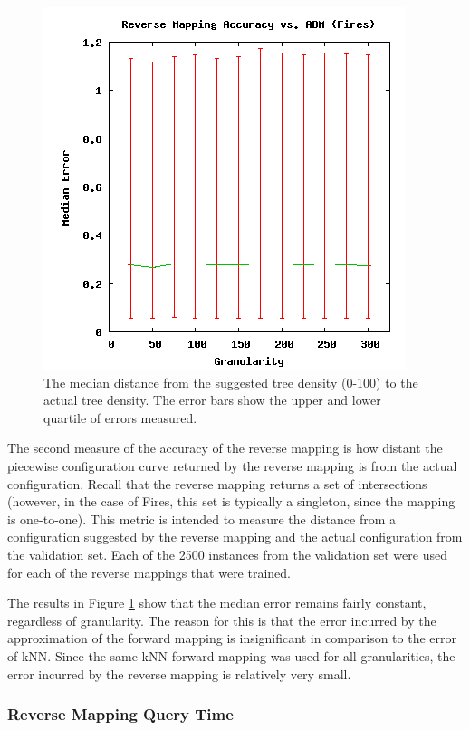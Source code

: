 \begin{figure}[ht]
\centering
\includegraphics[scale=.5]{images/results_fires/rmaccabm.png}
\caption{The median distance from the suggested tree density (0-100) to the actual tree density.
The error bars show the upper and lower quartile of errors measured.}
\label{fig:rmaccabm}
\end{figure}
The second measure of the accuracy of the reverse mapping is how distant the piecewise configuration curve returned by the reverse mapping is from the actual configuration.
Recall that the reverse mapping returns a set of intersections (however, in the case of Fires, this set is typically a singleton, since the mapping is one-to-one).
This metric is intended to measure the distance from a configuration suggested by the reverse mapping and the actual configuration from the validation set.
Each of the 2500 instances from the validation set were used for each of the reverse mappings that were trained.

The results in Figure \ref{fig:rmaccabm} show that the median error remains fairly constant, regardless of granularity.
The reason for this is that the error incurred by the approximation of the forward mapping is insignificant in comparison to the error of kNN.
Since the same kNN forward mapping was used for all granularities, the error incurred by the reverse mapping is relatively very small.


\subsubsection{Reverse Mapping Query Time}

